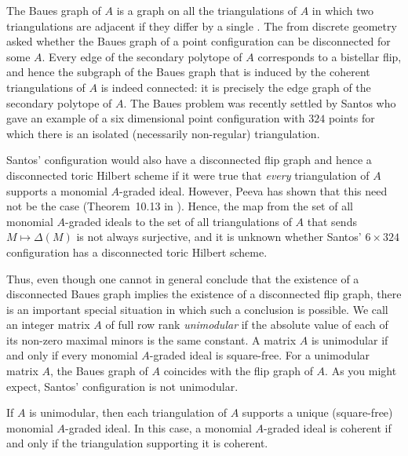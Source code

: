 \medskip

The Baues graph of $A$ is a graph on all the triangulations of
$A$ in which two triangulations are adjacent if they differ by a
single {\em {}} \cite{HS:Reiner}. The {\em {}} from
discrete geometry asked whether the Baues graph of a point
configuration can be disconnected for some $A$. Every edge of the
secondary polytope of $A$ corresponds to a bistellar flip, and hence
the subgraph of the Baues graph that is induced by the coherent
triangulations of $A$ is indeed connected: it is precisely the edge
graph of the secondary polytope of $A$.  The Baues problem was
recently settled by Santos \cite{HS:San} who gave an example of a six
dimensional point configuration with $324$ points for which there is
an isolated (necessarily non-regular) triangulation.

Santos' configuration would also have a disconnected flip graph and hence
a disconnected toric Hilbert scheme if it were true that {\em every} 
triangulation of $A$ supports a monomial $A$-graded
ideal. However, Peeva has shown that this need not be the case
(Theorem~10.13 in \cite[\S 10]{HS:St2}). Hence, the map from the set of
all monomial $A$-graded ideals to the set of all triangulations of
$A$ that sends $M \mapsto \Delta(M)$ is not always
surjective, and it is unknown whether Santos' $6 \times 324$ 
configuration has a disconnected toric Hilbert scheme.  

Thus, even though one cannot in general conclude that the existence of
a disconnected Baues graph implies the existence of a disconnected
flip graph, there is an important special situation in which such a
conclusion is possible. We call an integer matrix $A$ of full row rank
{\em unimodular} if the absolute value of each of its non-zero maximal
minors is the same constant. A matrix $A$ is unimodular if and only if
every monomial $A$-graded ideal is square-free. For a unimodular
matrix $A$, the Baues graph of $A$ coincides with the flip graph of
$A$. As you might expect, Santos' configuration is not unimodular.

\begin{theorem}\label{unimodular}
If $A$ is unimodular, then each triangulation of $A$ supports a unique
(square-free) monomial $A$-graded ideal. In this case, a monomial
$A$-graded ideal is coherent if and only if the triangulation
supporting it is coherent.
\end{theorem}

